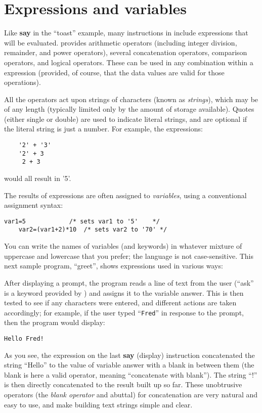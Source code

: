\section{Expressions and variables}
Like \textbf{say} in the “toast” example, many instructions in \nr{} include expressions that will be evaluated. \nr{} provides arithmetic operators (including integer division, remainder, and power operators), several concatenation operators, comparison operators, and logical operators. These can be used in any combination within a \nr{} expression (provided, of course, that the data values are valid for those operations).

All the operators act upon strings of characters (known as \emph{\nr{}
strings}), which may be of any length (typically limited only by the
amount of storage available). Quotes (either single or double) are
used to indicate literal strings, and are optional if the literal
string is just a number. For example, the expressions:
\begin{verbatim}
    '2' + '3'
    '2' + 3
     2 + 3
\end{verbatim}
would all result in '5'.

The results of expressions are often assigned to \emph{variables}, using a
conventional assignment syntax:
\begin{lstlisting}[label=assignment,caption=Assignment]
    var1=5            /* sets var1 to '5'    */
    var2=(var1+2)*10  /* sets var2 to '70' */
\end{lstlisting}
You can write the names of variables (and keywords) in whatever mixture of uppercase and lowercase that you prefer; the language is not case-sensitive.
This next sample program, “greet”, shows expressions used in various
ways:

After displaying a prompt, the program reads a line of text from the
user (“ask” is a keyword provided by \nr{}) and assigns it to the
variable answer. This is then tested to see if any characters were
entered, and different actions are taken accordingly; for example, if
the user typed “\texttt{Fred}” in response to the prompt, then the program
would display:
\begin{verbatim}
Hello Fred!
\end{verbatim}
As you see, the expression on the last \textbf{say} (display) instruction
concatenated the string “Hello” to the value of variable answer with a
blank in between them (the blank is here a valid operator, meaning
“concatenate with blank”). The string “!” is then directly
concatenated to the result built up so far. These unobtrusive
operators (the \emph{blank operator} and abuttal) for concatenation are very
natural and easy to use, and make building text strings simple and
clear.


